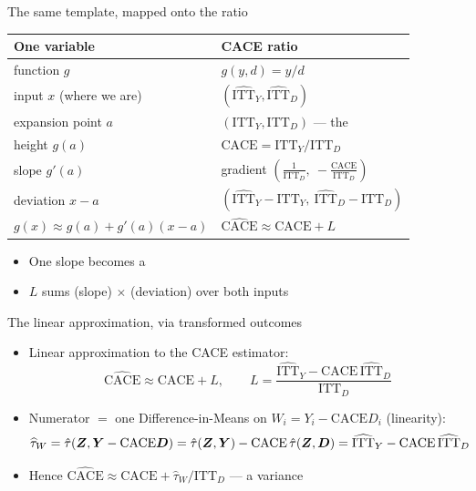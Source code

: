 \documentclass[table, xcolor = {dvipsnames}, 9pt]{beamer}
\theoremstyle{plain}
\newcommand{\mh}[1]{{\color{magenta}{#1}}}
\newcommand{\ITTY}{\mathrm{ITT}_Y}
\newcommand{\ITTD}{\mathrm{ITT}_D}
\newcommand{\CACE}{\mathrm{CACE}}
\newcommand{\hITTY}{\widehat{\mathrm{ITT}}_Y}
\newcommand{\hITTD}{\widehat{\mathrm{ITT}}_D}
\begin{document}
\begin{frame}[t]{The same template, mapped onto the ratio}
\vfill
\begin{center}
\small
\renewcommand{\arraystretch}{1.45}
\begin{tabular}{l|l}
\textbf{One variable} & \textbf{CACE ratio} \\ \hline
function $g$ & $g\left(y, d\right) = y / d$ \\
input $x$ (where we are) & $\left(\hITTY, \hITTD\right)$ \\
expansion point $a$ & $\left(\ITTY, \ITTD\right)$ --- the \mh{truth} \\
height $g(a)$ & $\CACE = \ITTY / \ITTD$ \\
slope $g'(a)$ & gradient $\left(\tfrac{1}{\ITTD},\ -\tfrac{\CACE}{\ITTD}\right)$ \\
deviation $x - a$ & $\left(\hITTY - \ITTY,\ \hITTD - \ITTD\right)$ \\ \hline
$g(x) \approx g(a) + g'(a)\left(x - a\right)$ & $\widehat{\CACE} \approx \CACE + L$ \\
\end{tabular}
\normalsize
\end{center}
\vfill
\begin{itemize} \vfill
\item One slope becomes a \mh{gradient} \vfill
\item $L$ sums (slope) $\times$ (deviation) over both inputs \vfill
\end{itemize} \vfill
\end{frame}
\begin{frame}[t]{The linear approximation, via transformed outcomes}
\vfill
\begin{itemize} \vfill
\item Linear approximation to the CACE estimator: \vfill
\vfill
\begin{equation*}
\widehat{\CACE} \approx \CACE + L, \qquad L = \frac{\hITTY - \CACE\,\hITTD}{\ITTD}
\end{equation*} \vfill
\item Numerator $=$ one Difference-in-Means on $W_i = Y_i - \CACE D_i$ (linearity): \vfill
\begin{equation*}
\resizebox{\linewidth}{!}{$\displaystyle \widehat{\tau}_W = \hat{\tau}\!\left(\bm{Z}, \bm{Y} - \CACE \bm{D}\right) = \hat{\tau}\!\left(\bm{Z}, \bm{Y}\right) - \CACE\,\hat{\tau}\!\left(\bm{Z}, \bm{D}\right) = \hITTY - \CACE\,\hITTD$}
\end{equation*} \vfill
\item Hence $\widehat{\CACE} \approx \CACE + \widehat{\tau}_W / \ITTD$ --- a \mh{simpler} variance \vfill
\end{itemize} \vfill
\end{frame}
\end{document}
